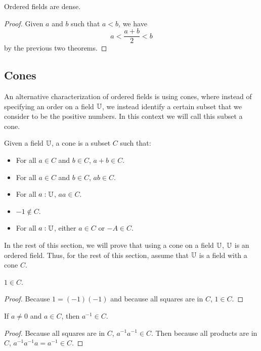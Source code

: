 \documentclass[../../math.tex]{subfiles}
\begin{document}
\begin{instance}
    Ordered fields are dense.
\end{instance}
\begin{proof}
    Given $a$ and $b$ such that $a < b$, we have
    \[
        a < \frac{a + b}{2} < b
    \]
    by the previous two theorems.
\end{proof}

\subsection{Cones}

An alternative characterization of ordered fields is using cones, where instead
of specifying an order on a field $\mathbb{U}$, we instead identify a certain subset
that we consider to be the positive numbers.  In this context we will call this
subset a cone.

\begin{class}
    Given a field $\mathbb{U}$, a cone is a subset $C$ such that:
    \begin{itemize}
        \item For all $a \in C$ and $b \in C$, $a + b \in C$.
        \item For all $a \in C$ and $b \in C$, $ab \in C$.
        \item For all $a : \mathbb{U}$, $aa \in C$.
        \item $-1 \notin C$.
        \item For all $a : \mathbb{U}$, either $a \in C$ or $-A \in C$.
    \end{itemize}
\end{class}

In the rest of this section, we will prove that using a cone on a field $\mathbb{U}$,
$\mathbb{U}$ is an ordered field.  Thus, for the rest of this section, assume that $\mathbb{U}$
is a field with a cone $C$.

\begin{theorem} \label{cone_one}
    $1 \in C$.
\end{theorem}
\begin{proof}
    Because $1 = (-1)(-1)$ and because all squares are in $C$, $1 \in C$.
\end{proof}

\begin{theorem} \label{cone_div}
    If $a \neq 0$ and $a \in C$, then $a^{-1} \in C$.
\end{theorem}
\begin{proof}
    Because all squares are in $C$, $a^{-1}a^{-1} \in C$.  Then because all
    products are in $C$, $a^{-1}a^{-1}a = a^{-1} \in C$.
\end{proof}
\end{document}
